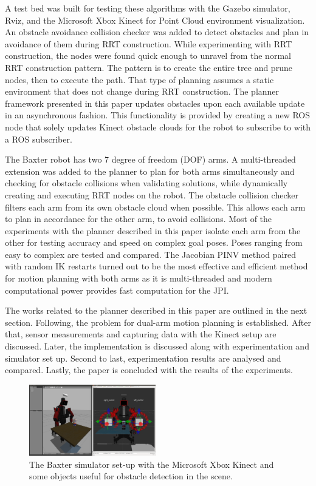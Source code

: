 \documentclass[conference]{IEEEtran} \usepackage[T1]{fontenc} \usepackage[backend=biber, style=ieee]{biblatex}
\begin{document}
A test bed was built for testing these algorithms with the Gazebo simulator, Rviz, and the Microsoft Xbox Kinect for Point Cloud environment visualization. An 
obstacle avoidance collision checker was added to detect obstacles and plan in avoidance of them during RRT construction. While experimenting with RRT 
construction, the nodes were found quick enough to unravel from the normal RRT construction pattern. The pattern is to create the entire tree and prune nodes, 
then to execute the path. That type of planning assumes a static environment that does not change during RRT construction. The planner framework presented in 
this paper updates obstacles upon each available update in an asynchronous fashion. This functionality is provided by creating a new ROS node that solely updates 
Kinect obstacle clouds for the robot to subscribe to with a ROS subscriber.

The Baxter robot has two 7 degree of freedom (DOF) arms. A multi-threaded extension was added to the planner to plan for both arms simultaneously and checking 
for obstacle collisions when validating solutions, while dynamically creating and executing RRT nodes on the robot. The obstacle collision checker filters 
each arm from its own obstacle cloud when possible. This allows each arm to plan in accordance for the other arm, to avoid collisions. Most of the experiments 
with the planner described in this paper isolate each arm from the other for testing accuracy and speed on complex goal poses. Poses ranging from easy to 
complex are tested and compared. The Jacobian PINV method paired with random IK restarts turned out to be the most effective and efficient method for motion 
planning with both arms as it is multi-threaded and modern computational power provides fast computation for the JPI.

The works related to the planner described in this paper are outlined in the next section. Following, the problem for dual-arm motion planning is established. 
After that, sensor measurements and capturing data with the Kinect setup are discussed. Later, the implementation is discussed along with experimentation and 
simulator set up. Second to last, experimentation results are analysed and compared. Lastly, the paper is concluded with the results of the experiments.

\begin{figure}
\label{pic1} 
\centering 
\includegraphics[width=0.49\textwidth]{sim1}
\caption{The Baxter simulator set-up with the Microsoft Xbox Kinect and some objects useful for obstacle detection in the scene.}
\end{figure}
\end{document}
